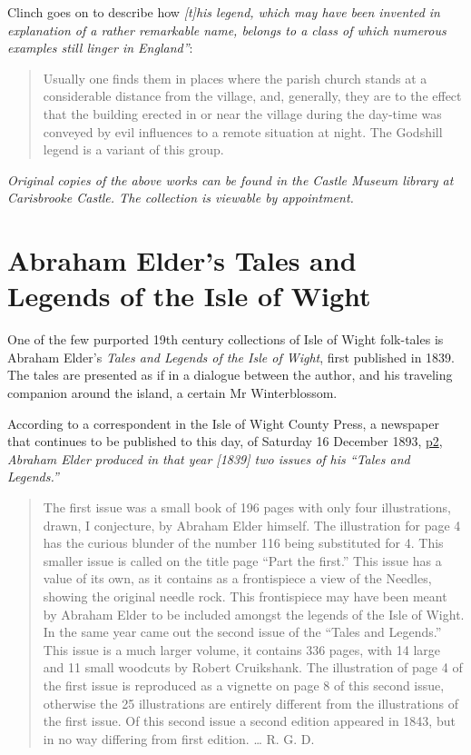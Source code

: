 \documentclass[
  12pt,
  a5paper,
  twoside]{book}
\begin{document}
Clinch goes on to describe how \emph{{[}t{]}his legend, which may have
been invented in explanation of a rather remarkable name, belongs to a
class of which numerous examples still linger in England''}:

\begin{quote}
Usually one finds them in places where the parish church stands at a
considerable distance from the village, and, generally, they are to the
effect that the building erected in or near the village during the
day-time was conveyed by evil influences to a remote situation at night.
The Godshill legend is a variant of this group.
\end{quote}

\emph{Original copies of the above works can be found in the Castle
Museum library at Carisbrooke Castle. The collection is viewable by
appointment.}


\chapter{Abraham Elder's Tales and Legends of the Isle of
Wight}\label{abraham-elders-tales-and-legends-of-the-isle-of-wight}

One of the few purported 19th century collections of Isle of Wight
folk-tales is Abraham Elder's \emph{Tales and Legends of the Isle of
Wight}, first published in 1839. The tales are presented as if in a
dialogue between the author, and his traveling companion around the
island, a certain Mr Winterblossom.

According to a correspondent in the Isle of Wight County Press, a
newspaper that continues to be published to this day, of Saturday 16
December 1893,
\href{https://www.britishnewspaperarchive.co.uk/viewer/bl/0001960/18931216/025/0002}{p2},
\emph{Abraham Elder produced in that year {[}1839{]} two issues of his
``Tales and Legends.''}

\begin{quote}
The first issue was a small book of 196 pages with only four
illustrations, drawn, I conjecture, by Abraham Elder himself. The
illustration for page 4 has the curious blunder of the number 116 being
substituted for 4. This smaller issue is called on the title page ``Part
the first.'' This issue has a value of its own, as it contains as a
frontispiece a view of the Needles, showing the original needle rock.
This frontispiece may have been meant by Abraham Elder to be included
amongst the legends of the Isle of Wight. In the same year came out the
second issue of the ``Tales and Legends.'' This issue is a much larger
volume, it contains 336 pages, with 14 large and 11 small woodcuts by
Robert Cruikshank. The illustration of page 4 of the first issue is
reproduced as a vignette on page 8 of this second issue, otherwise the
25 illustrations are entirely different from the illustrations of the
first issue. Of this second issue a second edition appeared in 1843, but
in no way differing from first edition. \ldots{} R. G. D.
\end{quote}
\end{document}
